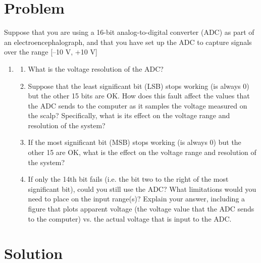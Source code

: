 \documentclass[12pt, a4paper]{article}
\begin{document}
\vspace*{-3mm}
\section*{Problem}
Suppose that you are using a 16-bit analog-to-digital converter (ADC) as part of an
electroencephalograph, and that you have set up the ADC to capture signals over the range
[–10 V, +10 V]
\begin{enumerate} \item
 \begin{enumerate} \item
What is the voltage resolution of the ADC?
\item
Suppose that the least significant bit (LSB) stops working (is always 0) but the other 15
bits are OK. How does this fault affect the values that the ADC sends to the computer as it
samples the voltage measured on the scalp? Specifically, what is its effect on the voltage
range and resolution of the system?

\item
If the most significant bit (MSB) stops working (is always 0) but the other 15 are OK,
what is the effect on the voltage range and resolution of the system?

\item
If only the 14th bit fails (i.e. the bit two to the right of the most significant bit), could you
still use the ADC? What limitations would you need to place on the input range(s)? Explain
your answer, including a figure that plots apparent voltage (the voltage value that the ADC
sends to the computer) vs. the actual voltage that is input to the ADC.
 \end{enumerate}
 \end{enumerate}
\section*{Solution}
\end{document}
